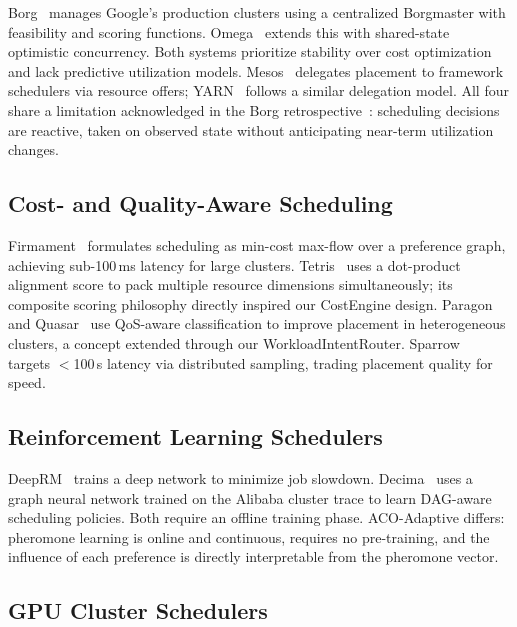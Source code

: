 \documentclass[conference]{IEEEtran}
\begin{document}
Borg~\cite{verma2015borg} manages Google's production clusters using a
centralized Borgmaster with feasibility and scoring functions.
Omega~\cite{schwarzkopf2013omega} extends this with shared-state optimistic
concurrency. Both systems prioritize stability over cost optimization and
lack predictive utilization models. Mesos~\cite{hindman2011mesos} delegates
placement to framework schedulers via resource offers;
YARN~\cite{vavilapalli2013yarn} follows a similar delegation model. All
four share a limitation acknowledged in the Borg
retrospective~\cite{burns2016borg}: scheduling decisions are reactive,
taken on observed state without anticipating near-term utilization changes.

\subsection{Cost- and Quality-Aware Scheduling}

Firmament~\cite{gog2016firmament} formulates scheduling as min-cost
max-flow over a preference graph, achieving sub-100\,ms latency for large
clusters. Tetris~\cite{grandl2014tetris} uses a dot-product alignment score
to pack multiple resource dimensions simultaneously; its composite scoring
philosophy directly inspired our CostEngine design.
Paragon~\cite{delimitrou2013paragon} and
Quasar~\cite{delimitrou2014quasar} use QoS-aware classification to improve
placement in heterogeneous clusters, a concept extended through our
WorkloadIntentRouter.
Sparrow~\cite{ousterhout2013sparrow} targets $<$100\,\textmu{}s latency
via distributed sampling, trading placement quality for speed.

\subsection{Reinforcement Learning Schedulers}

DeepRM~\cite{mao2016deeprm} trains a deep network to minimize job slowdown.
Decima~\cite{mao2019decima} uses a graph neural network trained on the
Alibaba cluster trace to learn DAG-aware scheduling policies. Both require
an offline training phase. ACO-Adaptive differs: pheromone learning is
online and continuous, requires no pre-training, and the influence of each
preference is directly interpretable from the pheromone vector.

\subsection{GPU Cluster Schedulers}
\end{document}
